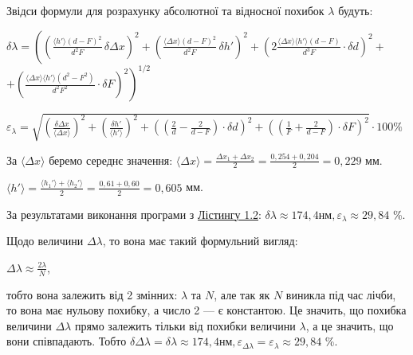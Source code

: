 \documentclass[12pt,a4paper]{article}
\begin{document}
    Звідси формули для розрахунку абсолютної та відносної похибок $\lambda$ будуть:

    \begin{center}
        $\displaystyle \delta \lambda = \left(
            \left(\frac{\langle h' \rangle (d - F)^2}{d^2 F}\,\delta  \Delta x \right)^2 +
            \left(\frac{\langle \Delta x \rangle (d - F)^2}{d^2 F}\,\delta h'\right)^2 +
            \left(2\frac{\langle \Delta x \rangle \langle h' \rangle (d - F)}{d^3 F} \cdot \delta d\right)^2 +
        \right.$ \\
        $\displaystyle \left.
            +\left( \frac{\langle \Delta x \rangle \langle h' \rangle \left( d^2 - F^2 \right)}{d^2 F^2} \cdot \delta F\right)^2 \right)^{1/2}$
    \end{center}

    \begin{center}
        $\displaystyle \varepsilon_\lambda =
        \sqrt{
        \left( \frac{\delta \Delta x}{\langle \Delta x \rangle} \right)^2 +
        \left( \frac{\delta h'}{\langle h' \rangle} \right)^2 +
        \left( \left( \frac{2}{d} - \frac{2}{d - F} \right) \cdot \delta d \right)^2 +
        \left( \left( \frac{1}{F} + \frac{2}{d - F} \right) \cdot \delta F \right)^2
        } \cdot 100 \%$
    \end{center}

    За $\langle \Delta x \rangle$ беремо середнє значення: $\displaystyle \langle \Delta x \rangle = \frac{\Delta x_1 + \Delta x_2}{2} = \frac{0,254 + 0,204}{2} = 0,229$ мм.

    $\displaystyle \langle h' \rangle = \frac{\langle h_1' \rangle + \langle h_2' \rangle}{2} = \frac{0,61 + 0,60}{2} = 0,605$ мм.

    \vspace{1em}

    За результатами виконання програми з \hyperlink{listing2}{Лістингу 1.2}: $\delta \lambda \approx 174,4 \text{нм}, \varepsilon_{\lambda} \approx 29,84$ \%.

    Щодо величини $\Delta \lambda$, то вона має такий формульний вигляд:

    \begin{center}
        $\displaystyle \Delta \lambda \approx \frac{2\lambda}{N}$,
    \end{center}

    тобто вона залежить від 2 змінних: $\lambda$ та $N$, але так як $N$ виникла під час лічби, то вона має нульову похибку, а число 2 --- є константою.
    Це значить, що похибка величини $\Delta \lambda$ прямо залежить тільки від похибки величини $\lambda$, а це значить, що вони співпадають.
    Тобто $\delta \Delta \lambda = \delta \lambda \approx 174,4 \text{нм}, \varepsilon_{\Delta \lambda} = \varepsilon_{\lambda} \approx 29,84$ \%.
\end{document}
